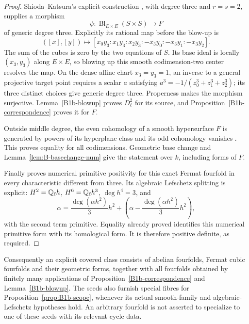 \begin{proof}
Shioda--Katsura's explicit construction
\cite[Lemmas~1.1--1.2, pp.~98--99; Theorem~1.7, pp.~101--102]
{ShiodaKatsura1979C}, with degree three and $r=s=2$, supplies a morphism
\[
 \psi:\operatorname{Bl}_{E\times E}(S\times S)\longrightarrow F
\]
of generic degree three. Explicitly its rational map before the blow-up is
\[
 ([x],[y])\longmapsto
 [x_0y_3:x_1y_3:x_2y_3:-x_3y_0:-x_3y_1:-x_3y_2].
\]
The sum of the cubes is zero by the two equations of $S$. Its base
ideal is locally $(x_3,y_3)$ along $E\times E$, so blowing up this
smooth codimension-two center resolves the map. On the dense affine
chart $x_3=y_3=1$, an inverse to a general projective target point
requires a scalar $a$ satisfying
$a^3=-1/(z_0^3+z_1^3+z_2^3)$; its three distinct choices give generic
degree three. Properness makes the morphism surjective.
Lemma~\ref{B1b-blowup} proves $D^2_\ell$ for its source, and
Proposition~\ref{B1b-correspondence} proves it for $F$.

Outside middle degree, the even cohomology of a smooth hypersurface
$F$ is generated by powers of its hyperplane class and its odd
cohomology vanishes \cite[Lemma~2.3, p.~103]{ShiodaKatsura1979C}.
This proves equality for all codimensions. Geometric base change and
Lemma~\ref{lem:B-basechange-num} give the statement over $k$, including
forms of $F$.

Finally \cite[Proposition~A.9]{BAncona2021} proves numerical primitive
positivity for this exact Fermat fourfold in every characteristic
different from three. Its algebraic Lefschetz splitting is explicit:
$H^2={\mathbb{Q}}_\ell h$, $H^6={\mathbb{Q}}_\ell h^3$, $\deg h^4=3$, and
\[
 \alpha=\frac{\deg(\alpha h^2)}{3}h^2+
       \left(\alpha-\frac{\deg(\alpha h^2)}{3}h^2\right),
\]
with the second term primitive. Equality already proved identifies
this numerical primitive form with its homological form. It is
therefore positive definite, as required.
\end{proof}

Consequently an explicit covered class consists of abelian fourfolds,
Fermat cubic fourfolds and their geometric forms, together with all
fourfolds obtained by finitely many applications of
Proposition~\ref{B1b-correspondence} and Lemma~\ref{B1b-blowup}.
The seeds also furnish special fibres for
Proposition~\ref{prop:B1b-scope}, whenever its actual smooth-family
and algebraic-Lefschetz hypotheses hold. An arbitrary fourfold is not
asserted to specialize to one of these seeds with its relevant cycle
data.


